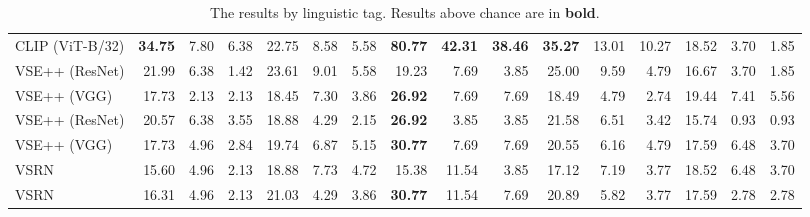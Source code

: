 \documentclass[10pt,twocolumn,letterpaper]{article}
\begin{document}
\begin{table*}[!ht]
{\begin{tabular}{lrrr|rrr|rrr|rrr|rrr}
 CLIP (ViT-B/32)              & \textbf{34.75} & 7.80           & 6.38           & 22.75          & 8.58           & 5.58           & \textbf{80.77} & \textbf{42.31} & \textbf{38.46} & \textbf{35.27} & 13.01          & 10.27          & 18.52          & 3.70           & 1.85           \\
 VSE++ (ResNet)      & 21.99          & 6.38           & 1.42           & 23.61          & 9.01           & 5.58           & 19.23          & 7.69           & 3.85           & 25.00          & 9.59           & 4.79           & 16.67          & 3.70           & 1.85           \\
 VSE++ (VGG)         & 17.73          & 2.13           & 2.13           & 18.45          & 7.30           & 3.86           & \textbf{26.92} & 7.69           & 7.69           & 18.49          & 4.79           & 2.74           & 19.44          & 7.41           & 5.56           \\
 VSE++ (ResNet) & 20.57          & 6.38           & 3.55           & 18.88          & 4.29           & 2.15           & \textbf{26.92} & 3.85           & 3.85           & 21.58          & 6.51           & 3.42           & 15.74          & 0.93           & 0.93           \\
 VSE++ (VGG)    & 17.73          & 4.96           & 2.84           & 19.74          & 6.87           & 5.15           & \textbf{30.77} & 7.69           & 7.69           & 20.55          & 6.16           & 4.79           & 17.59          & 6.48           & 3.70           \\
 VSRN                & 15.60          & 4.96           & 2.13           & 18.88          & 7.73           & 4.72           & 15.38          & 11.54          & 3.85           & 17.12          & 7.19           & 3.77           & 18.52          & 6.48           & 3.70           \\
 VSRN           & 16.31          & 4.96           & 2.13           & 21.03          & 4.29           & 3.86           & \textbf{30.77} & 11.54          & 7.69           & 20.89          & 5.82           & 3.77           & 17.59          & 2.78           & 2.78           \\
          \bottomrule
  \end{tabular}
  }
  \caption{The results by linguistic tag. Results above chance are in \textbf{bold}.}
    \label{tab:results-by-ling-tag}
\end{table*}
\end{document}
